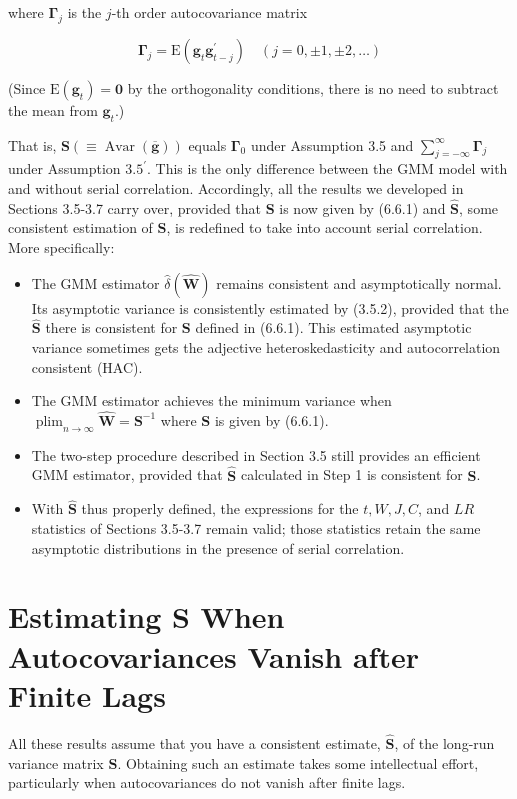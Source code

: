 \documentclass[10pt]{article}
\begin{document}
where $\boldsymbol{\Gamma}_{j}$ is the $j$-th order autocovariance matrix


\begin{equation*}
\boldsymbol{\Gamma}_{j}=\mathrm{E}\left(\mathbf{g}_{t} \mathbf{g}_{t-j}^{\prime}\right) \quad(j=0, \pm 1, \pm 2, \ldots) \tag{6.6.2}
\end{equation*}


(Since $\mathrm{E}\left(\mathbf{g}_{t}\right)=\mathbf{0}$ by the orthogonality conditions, there is no need to subtract the mean from $\mathbf{g}_{t}$.)

That is, $\mathbf{S}(\equiv \operatorname{Avar}(\overline{\mathbf{g}}))$ equals $\boldsymbol{\Gamma}_{0}$ under Assumption 3.5 and $\sum_{j=-\infty}^{\infty} \boldsymbol{\Gamma}_{j}$ under Assumption $3.5^{\prime}$. This is the only difference between the GMM model with and without serial correlation. Accordingly, all the results we developed in Sections 3.5-3.7 carry over, provided that $\mathbf{S}$ is now given by (6.6.1) and $\widehat{\mathbf{S}}$, some consistent estimation of $\mathbf{S}$, is redefined to take into account serial correlation. More specifically:

\begin{itemize}
  \item The GMM estimator $\hat{\delta}(\widehat{\mathbf{W}})$ remains consistent and asymptotically normal. Its asymptotic variance is consistently estimated by (3.5.2), provided that the $\widehat{\mathbf{S}}$ there is consistent for $\mathbf{S}$ defined in (6.6.1). This estimated asymptotic variance sometimes gets the adjective heteroskedasticity and autocorrelation consistent (HAC).
  \item The GMM estimator achieves the minimum variance when $\operatorname{plim}_{n \rightarrow \infty} \widehat{\mathbf{W}}=\mathbf{S}^{-1}$ where $\mathbf{S}$ is given by (6.6.1).
  \item The two-step procedure described in Section 3.5 still provides an efficient GMM estimator, provided that $\widehat{\mathbf{S}}$ calculated in Step 1 is consistent for $\mathbf{S}$.
  \item With $\widehat{\mathbf{S}}$ thus properly defined, the expressions for the $t, W, J, C$, and $L R$ statistics of Sections 3.5-3.7 remain valid; those statistics retain the same asymptotic distributions in the presence of serial correlation.
\end{itemize}

\section*{Estimating S When Autocovariances Vanish after Finite Lags}
All these results assume that you have a consistent estimate, $\widehat{\mathbf{S}}$, of the long-run variance matrix $\mathbf{S}$. Obtaining such an estimate takes some intellectual effort, particularly when autocovariances do not vanish after finite lags.
\end{document}
